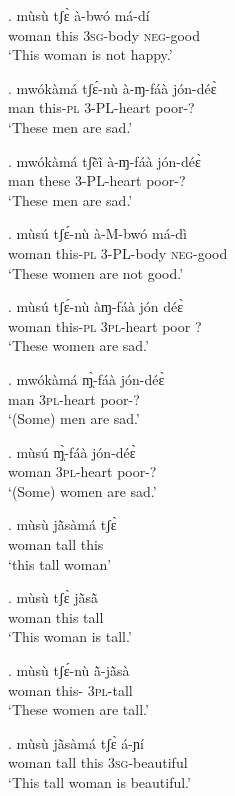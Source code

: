 \documentclass{assets/fieldnotes}
\begin{document}
{\exg. mùsù tʃɛ̀ à-bwó má-dí\\
woman this \textsc{3sg}-body \textsc{neg}-good\\
`This woman is not happy.'

\exg. mwókàmá tʃɛ́-nù à-ɱ-fáà jón-déɛ̀\\
man this-\textsc{pl} \textsc{3-PL}-heart poor-?\\
`These men are sad.'

\exg. mwókàmá tʃẽ̀ĩ à-ɱ-fáà jón-déɛ̀\\
man these \textsc{3-PL}-heart poor-?\\
`These men are sad.'

\exg. mùsú tʃɛ́-nù à-M-bwó má-dì\\
woman this-\textsc{pl} \textsc{3-PL}-body \textsc{neg}-good\\
`These women are not good.'

\exg. mùsú tʃɛ́-nù àɱ-fáà jón déɛ̀\\
woman this-\textsc{pl} \textsc{3pl}-heart poor ?\\
`These women are sad.'

\exg. mwókàmá ɱ̩̀-fáà jón-déɛ̀\\
man \textsc{3pl}-heart poor-?\\
`(Some) men are sad.'

\exg. mùsú ɱ̩̀-fáà jón-déɛ̀\\
woman \textsc{3pl}-heart poor-?\\
`(Some) women are sad.'\\

\exg. mùsù jã̀sàmá tʃɛ̀\\
woman tall this\\
`this tall woman’

\exg. mùsù tʃɛ̀ jã̀sã̀\\
woman this tall\\
`This woman is tall.’

\exg. mùsù tʃɛ́-nù ã̀-jã̀sà\\
woman this- \textsc{3pl}-tall\\
`These women are tall.'


\exg. mùsù jã̀sàmá tʃɛ̀ á-ɲí\\
woman tall this \textsc{3sg}-beautiful\\
`This tall woman is beautiful.'

}
\end{document}
